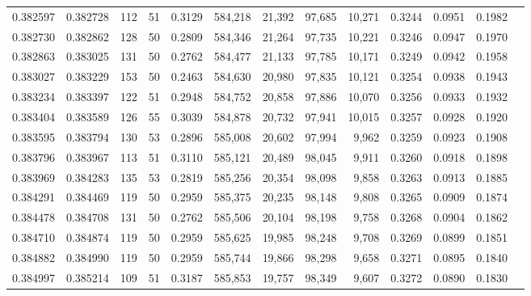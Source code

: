 \begin{tabular}{rrrrrrrrrrrrr}
0.382597 & 0.382728 &   112 &  51 &                                     0.3129 & 584,218 &  21,392 &  97,685 &  10,271 & 0.3244 & 0.0951 & 0.1982 \\
0.382730 & 0.382862 &   128 &  50 &                                     0.2809 & 584,346 &  21,264 &  97,735 &  10,221 & 0.3246 & 0.0947 & 0.1970 \\
0.382863 & 0.383025 &   131 &  50 &                                     0.2762 & 584,477 &  21,133 &  97,785 &  10,171 & 0.3249 & 0.0942 & 0.1958 \\
0.383027 & 0.383229 &   153 &  50 &                                     0.2463 & 584,630 &  20,980 &  97,835 &  10,121 & 0.3254 & 0.0938 & 0.1943 \\
0.383234 & 0.383397 &   122 &  51 &                                     0.2948 & 584,752 &  20,858 &  97,886 &  10,070 & 0.3256 & 0.0933 & 0.1932 \\
0.383404 & 0.383589 &   126 &  55 &                                     0.3039 & 584,878 &  20,732 &  97,941 &  10,015 & 0.3257 & 0.0928 & 0.1920 \\
0.383595 & 0.383794 &   130 &  53 &                                     0.2896 & 585,008 &  20,602 &  97,994 &   9,962 & 0.3259 & 0.0923 & 0.1908 \\
0.383796 & 0.383967 &   113 &  51 &                                     0.3110 & 585,121 &  20,489 &  98,045 &   9,911 & 0.3260 & 0.0918 & 0.1898 \\
0.383969 & 0.384283 &   135 &  53 &                                     0.2819 & 585,256 &  20,354 &  98,098 &   9,858 & 0.3263 & 0.0913 & 0.1885 \\
0.384291 & 0.384469 &   119 &  50 &                                     0.2959 & 585,375 &  20,235 &  98,148 &   9,808 & 0.3265 & 0.0909 & 0.1874 \\
0.384478 & 0.384708 &   131 &  50 &                                     0.2762 & 585,506 &  20,104 &  98,198 &   9,758 & 0.3268 & 0.0904 & 0.1862 \\
0.384710 & 0.384874 &   119 &  50 &                                     0.2959 & 585,625 &  19,985 &  98,248 &   9,708 & 0.3269 & 0.0899 & 0.1851 \\
0.384882 & 0.384990 &   119 &  50 &                                     0.2959 & 585,744 &  19,866 &  98,298 &   9,658 & 0.3271 & 0.0895 & 0.1840 \\
0.384997 & 0.385214 &   109 &  51 &                                     0.3187 & 585,853 &  19,757 &  98,349 &   9,607 & 0.3272 & 0.0890 & 0.1830 \\

\end{tabular}
